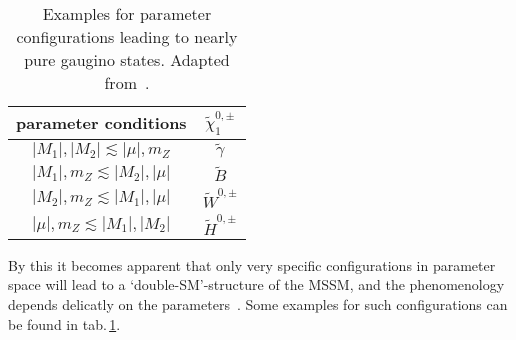 \begin{table}[H]\centering
\caption{Examples for parameter configurations leading to nearly pure gaugino states. Adapted from~\cite{pdg}.\label{gaugino}}
\begin{tabular}{cc}
parameter conditions&$\tilde{\chi}^{0, \pm}_1$\\\hline
$\left|M_1\right|, \left|M_2\right|\lesssim\left|\mu\right|, m_Z$&$\tilde{\gamma}$\\
$\left|M_1\right|, m_Z\lesssim\left|M_2\right|, \left|\mu\right|$&$\tilde{B}$\\
$\left|M_2\right|, m_Z\lesssim\left|M_1\right|, \left|\mu\right|$&$\tilde{W}^{0, \pm}$\\
$\left|\mu\right|, m_Z\lesssim\left|M_1\right|, \left|M_2\right|$&$\tilde{H}^{0, \pm}$
\end{tabular}
\end{table}
\noindent By this it becomes apparent that only very specific configurations in parameter space will lead to a `double-SM'-structure of the MSSM, and the phenomenology depends delicatly on the parameters~\cite{pdg, peskin}. Some examples for such configurations can be found in tab.\,\ref{gaugino}.